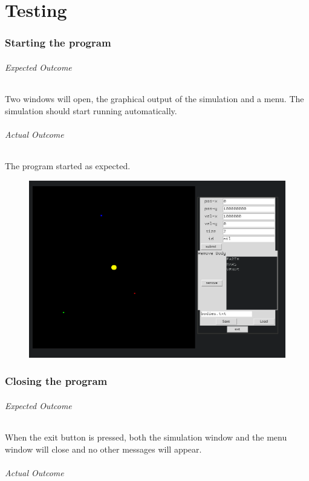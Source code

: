 \part{Testing}
\section{Starting the program}
\paragraph{Expected Outcome} 
Two windows will open, the graphical output of the simulation and a menu. The
simulation should start running automatically. 
\paragraph{Actual Outcome} 
The program started as expected.
\begin{figure}[H]
	\includegraphics[width=\textwidth]{./img/start.png}
\end{figure}

\section{Closing the program}
\paragraph{Expected Outcome}
When the exit button is pressed, both the simulation window and the menu window
will close and no other messages will appear.
\paragraph{Actual Outcome}

